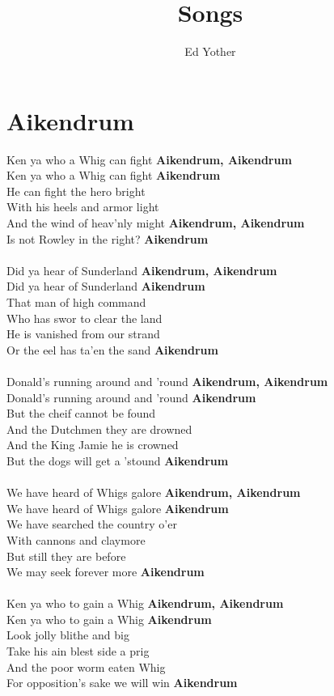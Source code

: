 \documentclass[letterpaper,14pt]{extarticle}
\title{Songs}
\author{Ed Yother}
\begin{document}
\maketitle

\section{Aikendrum}
\noindent
Ken ya who a Whig can fight \textbf{Aikendrum, Aikendrum}
\\Ken ya who a Whig can fight \textbf{Aikendrum}
\\He can fight the hero bright
\\With his heels and armor light
\\And the wind of heav'nly might \textbf{Aikendrum, Aikendrum}
\\Is not Rowley in the right? \textbf{Aikendrum}
\\
\\Did ya hear of Sunderland \textbf{Aikendrum, Aikendrum} 
\\Did ya hear of Sunderland \textbf{Aikendrum}
\\That man of high command
\\Who has swor to clear the land
\\He is vanished from our strand
\\Or the eel has ta'en the sand \textbf{Aikendrum}
\\
\\Donald's running around and 'round \textbf{Aikendrum, Aikendrum}
\\Donald's running around and 'round \textbf{Aikendrum}
\\But the cheif cannot be found
\\And the Dutchmen they are drowned
\\And the King Jamie he is crowned
\\But the dogs will get a 'stound \textbf{Aikendrum}
\\
\\We have heard of Whigs galore \textbf{Aikendrum, Aikendrum}
\\We have heard of Whigs galore \textbf{Aikendrum}
\\We have searched the country o'er
\\With cannons and claymore
\\But still they are before
\\We may seek forever more \textbf{Aikendrum}
\\
\\Ken ya who to gain a Whig \textbf{Aikendrum, Aikendrum}
\\Ken ya who to gain a Whig \textbf{Aikendrum}
\\Look jolly blithe and big
\\Take his ain blest side a prig
\\And the poor worm eaten Whig
\\For opposition's sake we will win \textbf{Aikendrum}
\end{document}
